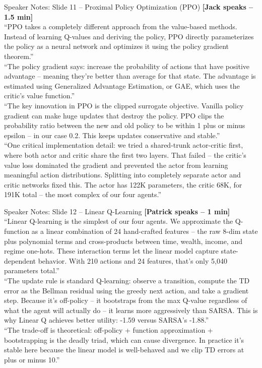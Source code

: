\documentclass[aspectratio=169, 11pt]{beamer}
\begin{document}
\begin{frame}[allowframebreaks]{Speaker Notes: Slide 11 -- Proximal Policy Optimization (PPO)}
\textbf{[Jack speaks -- 1.5 min]}\\
``PPO takes a completely different approach from the value-based methods. Instead of learning Q-values and deriving the policy, PPO directly parameterizes the policy as a neural network and optimizes it using the policy gradient theorem.''\\[0.5em]
``The policy gradient says: increase the probability of actions that have positive advantage -- meaning they're better than average for that state. The advantage is estimated using Generalized Advantage Estimation, or GAE, which uses the critic's value function.''\\[0.5em]
``The key innovation in PPO is the clipped surrogate objective. Vanilla policy gradient can make huge updates that destroy the policy. PPO clips the probability ratio between the new and old policy to be within 1 plus or minus epsilon -- in our case 0.2. This keeps updates conservative and stable.''\\[0.5em]
``One critical implementation detail: we tried a shared-trunk actor-critic first, where both actor and critic share the first two layers. That failed -- the critic's value loss dominated the gradient and prevented the actor from learning meaningful action distributions. Splitting into completely separate actor and critic networks fixed this. The actor has 122K parameters, the critic 68K, for 191K total -- the most complex of our four agents.''
\end{frame}

\begin{frame}[allowframebreaks]{Speaker Notes: Slide 12 -- Linear Q-Learning}
\textbf{[Patrick speaks -- 1 min]}\\
``Linear Q-learning is the simplest of our four agents. We approximate the Q-function as a linear combination of 24 hand-crafted features -- the raw 8-dim state plus polynomial terms and cross-products between time, wealth, income, and regime one-hots. These interaction terms let the linear model capture state-dependent behavior. With 210 actions and 24 features, that's only 5,040 parameters total.''\\[0.5em]
``The update rule is standard Q-learning: observe a transition, compute the TD error as the Bellman residual using the greedy next action, and take a gradient step. Because it's off-policy -- it bootstraps from the max Q-value regardless of what the agent will actually do -- it learns more aggressively than SARSA. This is why Linear Q achieves better utility: -1.59 versus SARSA's -1.88.''\\[0.5em]
``The trade-off is theoretical: off-policy + function approximation + bootstrapping is the deadly triad, which can cause divergence. In practice it's stable here because the linear model is well-behaved and we clip TD errors at plus or minus 10.''
\end{frame}
\end{document}
